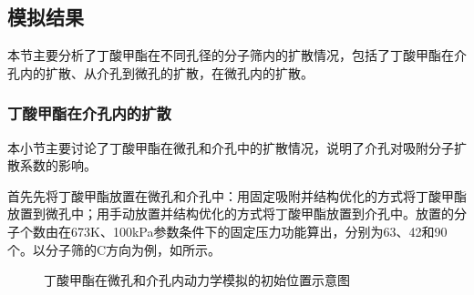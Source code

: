 \subsection{模拟结果}
\par{本节主要分析了丁酸甲酯在不同孔径的分子筛内的扩散情况，包括了丁酸甲酯在介孔内的扩散、从介孔到微孔的扩散，在微孔内的扩散。}

\subsubsection{丁酸甲酯在介孔内的扩散}
\par{本小节主要讨论了丁酸甲酯在微孔和介孔中的扩散情况，说明了介孔对吸附分子扩散系数的影响。}
\par{首先先将丁酸甲酯放置在微孔和介孔中：用固定吸附并结构优化的方式将丁酸甲酯放置到微孔中；用手动放置并结构优化的方式将丁酸甲酯放置到介孔中。放置的分子个数由在673K、100kPa参数条件下的固定压力功能算出，分别为63、42和90个。以分子筛的C方向为例，如所示。}

\begin{figure}[H]
    \centering

    \caption{丁酸甲酯在微孔和介孔内动力学模拟的初始位置示意图}
    \label{fig:MMM}
\end{figure}

